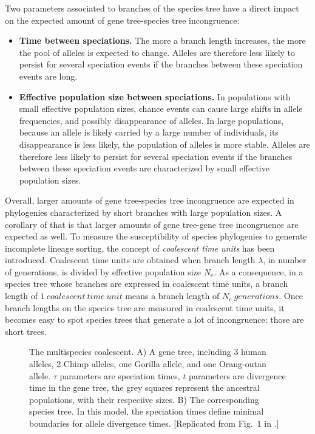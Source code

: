 Two parameters associated to branches of the species tree have a direct impact on the expected amount of gene tree-species tree incongruence:
\begin{itemize}
\item \textbf{Time between speciations.} The more a branch length increases, the more the pool of alleles is expected to change.
Alleles are therefore less likely to persist for several speciation events if the branches between these speciation events are long.
\item \textbf{Effective population size between speciations.} In populations with small effective population sizes, chance events can cause large shifts in allele frequencies, and possibly disappearance of alleles. 
In large populations, because an allele is likely carried by a large number of individuals, its disappearance is less likely, the population of alleles is more stable.
Alleles are therefore less likely to persist for several speciation events if the branches between these speciation events are characterized by small effective population sizes.
\end{itemize}
Overall, larger amounts of gene tree-species tree incongruence are expected in phylogenies characterized by short branches with large population sizes. 
A corollary of that is that larger amounts of gene tree-gene tree incongruence are expected as well. 
To measure the susceptibility of species phylogenies to generate incomplete lineage sorting, the concept of \emph{coalescent time units} has been introduced.
Coalescent time units are obtained when branch length $\lambda$, in number of generations, is divided by effective population size $N_e$.
As a consequence, in a species tree whose branches are expressed in coalescent time units, a branch length of $1~coalescent~time~unit $ means a branch length of $N_e~generations$. 
Once branch lengths on the species tree are measured in coalescent time units, it becomes easy to spot species trees that generate a lot of incongruence: those are short trees.

\begin{figure}[h!]
\centering
{}
\caption{\small The multispecies coalescent. A) A gene tree, including 3 human alleles, 2 Chimp alleles, one Gorilla allele, and one Orang-outan allele. $\tau$ parameters are speciation times, $t$ parameters are divergence time in the gene tree, the grey squares represent the ancestral populations, with their respeciive sizes.  B) The corresponding species tree. In this model, the speciation times define minimal boundaries for allele divergence times. [Replicated from Fig.~1 in \citet{Rannala2003a}.]}
\label{fig2}
\end{figure}

